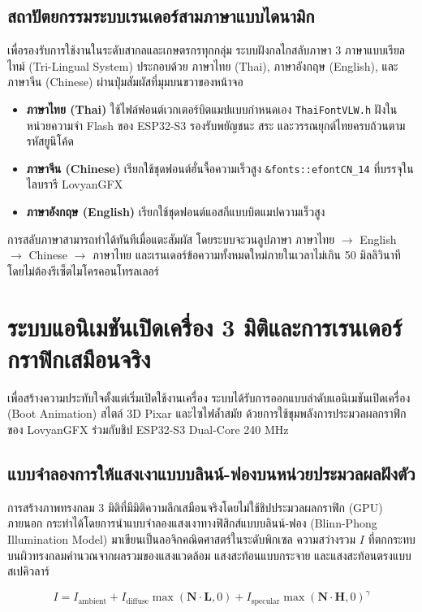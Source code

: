 \subsection{สถาปัตยกรรมระบบเรนเดอร์สามภาษาแบบไดนามิก}

เพื่อรองรับการใช้งานในระดับสากลและเกษตรกรทุกกลุ่ม ระบบฝังกลไกสลับภาษา 3 ภาษาแบบเรียลไทม์ (Tri-Lingual System) ประกอบด้วย ภาษาไทย (Thai), ภาษาอังกฤษ (English), และภาษาจีน (Chinese) ผ่านปุ่มสัมผัสที่มุมบนขวาของหน้าจอ
\begin{itemize}
    \item \textbf{ภาษาไทย (Thai)} ใช้ไฟล์ฟอนต์เวกเตอร์บิตแมปแบบกำหนดเอง \texttt{ThaiFontVLW.h} ฝังในหน่วยความจำ Flash ของ ESP32-S3 รองรับพยัญชนะ สระ และวรรณยุกต์ไทยครบถ้วนตามรหัสยูนิโค้ด
    \item \textbf{ภาษาจีน (Chinese)} เรียกใช้ชุดฟอนต์ฮั่นจื้อความเร็วสูง \texttt{\&fonts::efontCN\_14} ที่บรรจุในไลบรารี LovyanGFX
    \item \textbf{ภาษาอังกฤษ (English)} เรียกใช้ชุดฟอนต์แอสกีแบบบิตแมปความเร็วสูง
\end{itemize}
การสลับภาษาสามารถทำได้ทันทีเมื่อแตะสัมผัส โดยระบบจะวนลูปภาษา ภาษาไทย $\rightarrow$ English $\rightarrow$ Chinese $\rightarrow$ ภาษาไทย และเรนเดอร์ข้อความทั้งหมดใหม่ภายในเวลาไม่เกิน 50 มิลลิวินาทีโดยไม่ต้องรีเซ็ตไมโครคอนโทรลเลอร์

\section{ระบบแอนิเมชันเปิดเครื่อง 3 มิติและการเรนเดอร์กราฟิกเสมือนจริง}

เพื่อสร้างความประทับใจตั้งแต่เริ่มเปิดใช้งานเครื่อง ระบบได้รับการออกแบบลำดับแอนิเมชันเปิดเครื่อง (Boot Animation) สไตล์ 3D Pixar และไซไฟล้ำสมัย ด้วยการใช้ขุมพลังการประมวลผลกราฟิกของ LovyanGFX ร่วมกับชิป ESP32-S3 Dual-Core 240 MHz

\subsection{แบบจำลองการให้แสงเงาแบบบลินน์-ฟองบนหน่วยประมวลผลฝังตัว}

การสร้างภาพทรงกลม 3 มิติที่มีมิติความลึกเสมือนจริงโดยไม่ใช้ชิปประมวลผลกราฟิก (GPU) ภายนอก กระทำได้โดยการนำแบบจำลองแสงเงาทางฟิสิกส์แบบบลินน์-ฟอง (Blinn-Phong Illumination Model) มาเขียนเป็นลอจิกคณิตศาสตร์ในระดับพิกเซล ความสว่างรวม $I$ ที่ตกกระทบบนผิวทรงกลมคำนวณจากผลรวมของแสงแวดล้อม แสงสะท้อนแบบกระจาย และแสงสะท้อนตรงแบบสเปคิวลาร์

\begin{equation}
    I = I_{\text{ambient}} + I_{\text{diffuse}} \max(\mathbf{N} \cdot \mathbf{L}, 0) + I_{\text{specular}} \max(\mathbf{N} \cdot \mathbf{H}, 0)^\gamma
    \label{eq:blinn_phong}
\end{equation}


